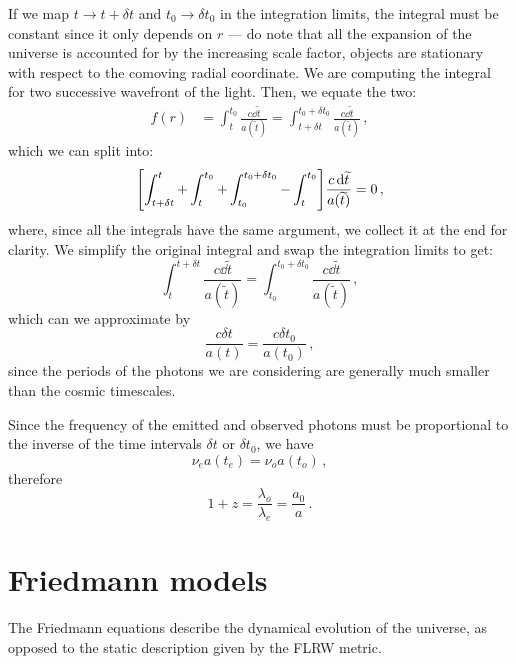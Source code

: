 \documentclass[main.tex]{subfiles}
\begin{document}
If we map \(t \rightarrow t + \delta t\) and \(t_0 \rightarrow \delta t_0 \) in the integration limits, the integral must be constant since it only depends on \(r\) --- do note that all the expansion of the universe is accounted for by the increasing scale factor, objects are stationary with respect to the comoving radial coordinate.
We are computing the integral for two successive wavefront of the light.
Then, we equate the two: 
%
\begin{align}
f(r) &= \int_{t}^{t_0 } \frac{c \dd{\widetilde{t} }}{a(\widetilde{t})} = \int_{t+\delta t}^{t_0 + \delta t_0 } \frac{c \dd{\widetilde{t} }}{a(\widetilde{t})}
\,,
\end{align}
%
which we can split into: 
%
\begin{align}
\qty[\int_{t+ \delta t}^{t} + \int_{t}^{t_0} + \int_{t_0 }^{t_0 + \delta t_0 } - \int_{t}^{t_0 }] \frac{c \dd{\widetilde{t}}}{a(\widetilde{t})} = 0
\,,
\end{align}
%
where, since all the integrals have the same argument, we collect it at the end for clarity.
We simplify the original integral and swap the integration limits to get:
\begin{equation}
  \int_{t}^{t + \delta t} \frac{c\dd{\widetilde{t}}}{a(\widetilde{t})} = \int_{t_0 }^{t_0 + \delta t_0 } \frac{c\dd{\widetilde{t}}}{a(\widetilde{t})}\,,
\end{equation}
%
which can we approximate by
\begin{equation}
\frac{c \delta t}{a(t)} =   \frac{c \delta t_0 }{a(t_0 )}\,,
\end{equation}
%
since the periods of the photons we are considering are generally much smaller than the cosmic timescales.

Since the frequency of the emitted and observed photons must be proportional to the inverse of the time intervals \(\delta t\) or \(\delta t_0 \), we have
\begin{equation}
  \nu_{e} a(t_{e}) = \nu_{o} a(t_{o})\,,
\end{equation}
%
therefore 
%
\begin{equation}
  1 + z = \frac{\lambda_{o}}{\lambda_{e}}
  = \frac{a_0 }{a}\,.
\end{equation}

\chapter{Friedmann models}

The Friedmann equations describe the dynamical evolution of the universe, as opposed to the static description given by the FLRW metric.
\end{document}
